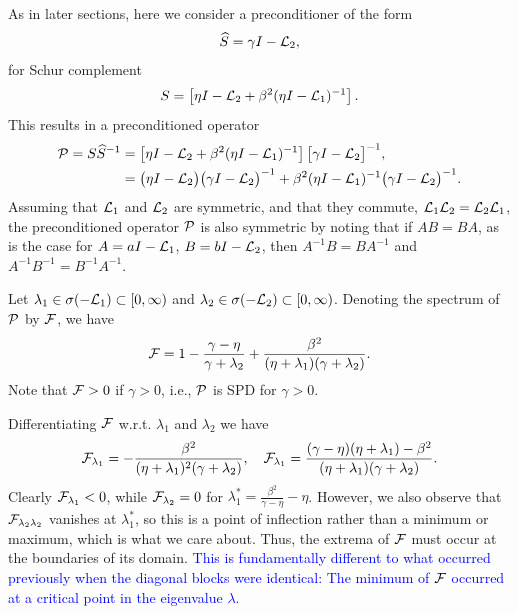 \documentclass[a4paper,10pt]{article}
\newcommand{\tcb}{\textcolor{blue}}
\begin{document}
{As in later sections, here we consider a preconditioner of the form
\begin{align}
\widehat{S} = \gamma I -  {\cal L}_2,
\end{align}
for Schur complement
\begin{align}
S
= 
\left[ \eta I - {\cal L}_2 + \beta^2(\eta I - {\cal L}_1)^{-1} \right].
\end{align}
This results in a preconditioned operator
\begin{align}
{\cal P}
= 
S \widehat{S}^{-1} 
&= 
\left[ \eta I - {\cal L}_2 + \beta^2(\eta I - {\cal L}_1)^{-1} \right] 
\big[ \gamma I -  {\cal L}_2 \big]^{-1}, \\
&=
\big( \eta I - {\cal L}_2 \big) \big( \gamma I -  {\cal L}_2 \big)^{-1}  + \beta^2(\eta I - {\cal L}_1)^{-1} \big( \gamma I -  {\cal L}_2 \big)^{-1}.
\end{align}
Assuming that ${\cal L}_1$ and ${\cal L}_2$ are symmetric, and that they commute, ${\cal L}_1 {\cal L}_2 = {\cal L}_2 {\cal L}_1$, the preconditioned operator ${\cal P}$ is also symmetric by noting that if $AB = BA$, as is the case for $A = a I - {\cal L}_1$, $B = b I - {\cal L}_2$, then $A^{-1} B = B  A^{-1}$ and $A^{-1} B^{-1} = B^{-1} A^{-1}$.

Let $\lambda_1 \in \sigma(- {\cal L}_1) \subset [0,\infty)$ and $\lambda_2 \in \sigma(- {\cal L}_2) \subset [0,\infty)$. Denoting the spectrum of ${\cal P}$ by ${\cal F}$, we have
\begin{align}
{\cal F} 
= 
1 - 
\frac{\gamma - \eta}{\gamma + \lambda_2}
+
\frac{\beta^2}{(\eta + \lambda_1)(\gamma + \lambda_2)}.
\end{align}
Note that ${\cal F} > 0$ if $\gamma > 0$, i.e., ${\cal P}$ is SPD for $\gamma > 0$.

Differentiating ${\cal F}$ w.r.t. $\lambda_1$ and $\lambda_2$ we have
\begin{align}
{\cal F}_{\lambda_1} = -  \frac{\beta^2}{(\eta + \lambda_1)^2(\gamma + \lambda_2)}, 
\quad
{\cal F}_{\lambda_1} =  \frac{(\gamma-\eta)(\eta + \lambda_1) - \beta^2}{(\eta + \lambda_1)(\gamma + \lambda_2)}.
\end{align}
Clearly ${\cal F}_{\lambda_1} < 0$, while ${\cal F}_{\lambda_2} = 0$ for $\lambda_1^* = \frac{\beta^2}{\gamma - \eta} - \eta$. However, we also observe that ${\cal F}_{\lambda_2 \lambda_2}$ vanishes at  $\lambda_1^*$, so this is a point of inflection rather than a minimum or maximum, which is what we care  about. Thus, the extrema of ${\cal F}$ must occur at the boundaries of its domain. \tcb{This is fundamentally different to what occurred previously when the diagonal blocks were identical: The minimum of ${\cal F}$ occurred at a critical point in the eigenvalue $\lambda$.}

}
\end{document}
